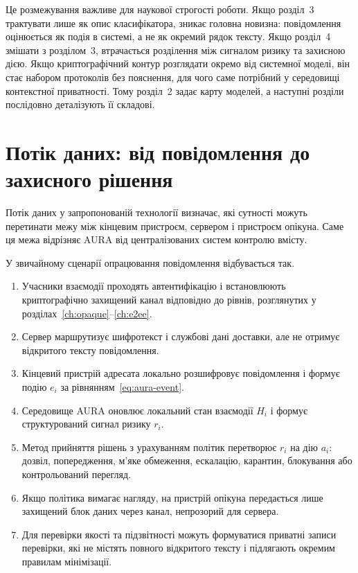 Це розмежування важливе для наукової строгості роботи. Якщо розділ~3 трактувати лише як опис класифікатора, зникає головна новизна: повідомлення оцінюється як подія в системі, а не як окремий рядок тексту. Якщо розділ~4 змішати з розділом~3, втрачається розділення між сигналом ризику та захисною дією. Якщо криптографічний контур розглядати окремо від системної моделі, він стає набором протоколів без пояснення, для чого саме потрібний у середовищі контекстної приватності. Тому розділ~2 задає карту моделей, а наступні розділи послідовно деталізують її складові.

\section{Потік даних: від повідомлення до захисного рішення}
\label{sec:dataflow}

Потік даних у запропонованій технології визначає, які сутності можуть перетинати межу між кінцевим пристроєм, сервером і пристроєм опікуна. Саме ця межа відрізняє AURA від централізованих систем контролю вмісту.

У звичайному сценарії опрацювання повідомлення відбувається так.

\begin{enumerate}
  \item Учасники взаємодії проходять автентифікацію і встановлюють криптографічно захищений канал відповідно до рівнів, розглянутих у розділах~\ref{ch:opaque}--\ref{ch:e2ee}.
  \item Сервер маршрутизує шифротекст і службові дані доставки, але не отримує відкритого тексту повідомлення.
  \item Кінцевий пристрій адресата локально розшифровує повідомлення і формує подію \(e_i\) за рівнянням~\eqref{eq:aura-event}.
  \item Середовище AURA оновлює локальний стан взаємодії \(H_i\) і формує структурований сигнал ризику \(r_i\).
  \item Метод прийняття рішень з урахуванням політик перетворює \(r_i\) на дію \(a_i\): дозвіл, попередження, м'яке обмеження, ескалацію, карантин, блокування або контрольований перегляд.
  \item Якщо політика вимагає нагляду, на пристрій опікуна передається лише захищений блок даних через канал, непрозорий для сервера.
  \item Для перевірки якості та підзвітності можуть формуватися приватні записи перевірки, які не містять повного відкритого тексту і підлягають окремим правилам мінімізації.
\end{enumerate}

